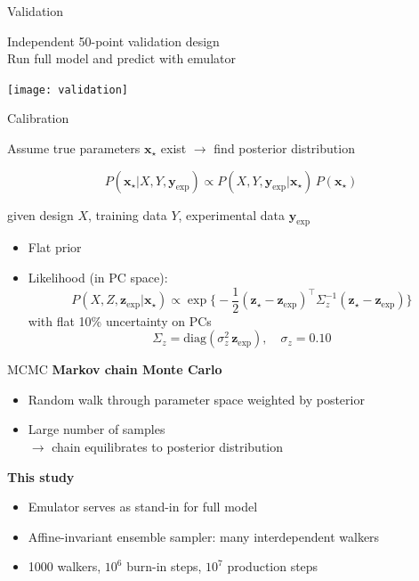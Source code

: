 \documentclass{beamer}
\newcommand{\tran}{^\intercal}
\newcommand{\x}{\mathbf x}
\newcommand{\y}{\mathbf y}
\newcommand{\z}{\mathbf z}
\newcommand{\xs}{\x_\star}
\newcommand{\yexp}{\y_\text{exp}}
\begin{document}
\begin{frame}{Validation}
  \begin{center}
    Independent 50-point validation design \\[1em]
    Run full model and predict with emulator
  \end{center}
  \texttt{[image: validation]}
\end{frame}


\newcommand{\st}{_\star}
\newcommand{\ex}{_\text{exp}}

\begin{frame}{Calibration}
  \begin{center}
    Assume true parameters $\xs$ exist $\rightarrow$ find posterior distribution
  \end{center}
  \begin{equation*}
    P(\xs|X,Y,\yexp) \propto P(X,Y,\yexp|\xs) \, P(\xs)
  \end{equation*}
  \begin{center}
    given design $X$, training data $Y$, experimental data $\yexp$
  \end{center}
  \begin{itemize}
    \item Flat prior
    \item Likelihood (in PC space):
      \begin{equation*}
        P(X,Z,\z\ex|\x\st) \propto
        \exp\biggl\{
          -\frac{1}{2} (\z\st - \z\ex)\tran \Sigma_z^{-1} (\z\st - \z\ex)
        \biggr\}
      \end{equation*}
      with flat 10\% uncertainty on PCs
      \begin{equation*}
        \Sigma_z = \text{diag}(\sigma^2_z\,\z\ex), \quad
        \sigma_z = 0.10
      \end{equation*}
  \end{itemize}
\end{frame}

\begin{frame}{MCMC}
  \centering
  \textbf{Markov chain Monte Carlo}
  \vspace{1ex}
  \begin{itemize}
    \item Random walk through parameter space weighted by posterior
    \item Large number of samples \\
      $\rightarrow$ chain equilibrates to posterior distribution
  \end{itemize}
  \vspace{3ex}
  \textbf{This study}
  \vspace{1ex}
  \begin{itemize}
    \item Emulator serves as stand-in for full model
    \item Affine-invariant ensemble sampler: many interdependent walkers
    \item 1000 walkers, $10^6$ burn-in steps, $10^7$ production steps
  \end{itemize}
\end{frame}
\end{document}
